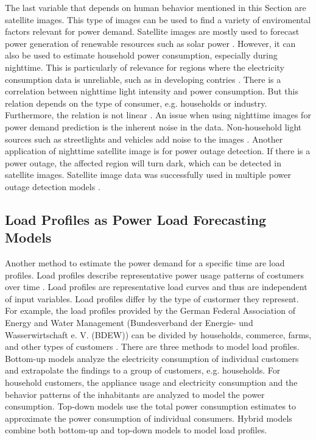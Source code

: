 The last variable that depends on human behavior mentioned in this Section are
satellite images. This type of images can be used to find a variety 
of enviromental factors relevant for power demand.
Satellite images are mostly used to forecast power generation of 
renewable resources such as solar power \cite{solarprediction}.
However, it can also be used to estimate household power consumption,
especially during nighttime. This is particularly of relevance for regions 
where the electricity consumption data is unreliable, such as in developing contries
\cite{reviewnighttime}. There is a correlation 
between nighttime light intensity and power consumption.
But this relation depends on the type of consumer, e.g. households or industry. 
Furthermore, the relation is not linear \cite{nighttimepowerestimation}. 
An issue when using nighttime images for power demand prediction is 
the inherent noise in the data. Non-household light sources such as 
streetlights and vehicles add noise to the images \cite{reviewnighttime}.
Another application of nighttime satellite image is for power outage detection.
If there is a power outage, the affected region will turn dark, which 
can be detected in satellite images. Satellite image data 
was successfully used in multiple power outage detection models
\cite{nightpoweroutage} \cite{twitterpoweroutagelighttime}.

\subsection{Load Profiles as Power Load Forecasting Models}
\label{loadprofilebasic}
Another method to estimate the power demand for a specific time are load 
profiles. Load profiles describe representative power usage patterns 
of costumers over time \cite{proedrou2021comprehensive}. Load profiles are 
representative load curves and thus are independent of input variables.
Load profiles differ by the type of custormer they represent. For 
example, the load profiles provided by the German Federal Association of 
Energy and Water Management (Bundesverband der Energie- und Wasserwirtschaft 
e. V. (BDEW)) can be divided by households, commerce, 
farms, and other types of customers \cite{meier1999reprasentative}.
There are three methods to model load profiles.
Bottom-up models analyze the electricity consumption of individual customers
and extrapolate the findings to a group of customers, e.g. households.
For household customers, the appliance usage and electricity consumption 
and the behavior patterns of the inhabitants are analyzed to model
the power consumption. Top-down models use the total power consumption 
estimates to approximate the power consumption of individual consumers.
Hybrid models combine both bottom-up and top-down models to model 
load profiles. 

